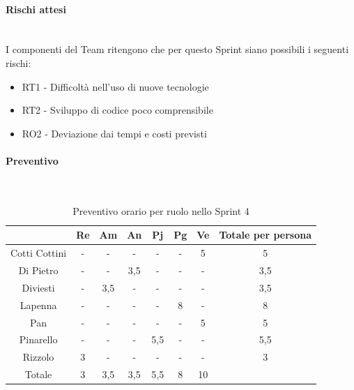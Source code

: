 \documentclass{article}
\begin{document}
                \paragraph{Rischi attesi}\mbox{}\\
                I componenti del Team ritengono che per questo Sprint siano possibili i seguenti rischi:
                \begin{itemize}
                    \item RT1 - Difficoltà nell’uso di nuove tecnologie
                    \item RT2 - Sviluppo di codice poco comprensibile
                    \item RO2 - Deviazione dai tempi e costi previsti
                \end{itemize}

                \paragraph{Preventivo}\mbox{}\\
                \begin{table}[H]
                    \centering
                    \begin{tabular}{|c|c|c|c|c|c|c|c|}
                    \hline
                                  & Re  & Am  & An  & Pj  & Pg  & Ve  & Totale per persona \\ \hline
                    Cotti Cottini & -   & -   & -   & -   & -   & 5   & 5                  \\ \hline
                    Di Pietro     & -   & -   & 3,5 & -   & -   & -   & 3,5                \\ \hline
                    Diviesti      & -   & 3,5 & -   & -   & -   & -   & 3,5                \\ \hline
                    Lapenna       & -   & -   & -   & -   & 8  & -   & 8                 \\ \hline
                    Pan           & -   & -   & -   & -   & -   & 5   & 5                  \\ \hline
                    Pinarello     & -   & -   & -   & 5,5 & -   & -   & 5,5                \\ \hline
                    Rizzolo       & 3   & -   & -   & -   & -   & -   & 3                  \\ \hline
                    Totale        & 3   & 3,5 & 3,5 & 5,5 & 8  & 10  &                    \\ \hline
                    \end{tabular}
                    \caption{Preventivo orario per ruolo nello Sprint 4}
                \end{table}
\end{document}
